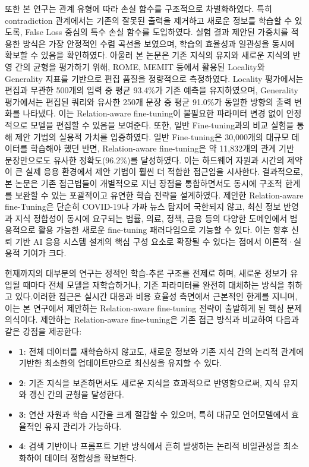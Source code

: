 \documentclass[a4paper,fleqn]{cas-sc}
\begin{document}
또한 본 연구는 관계 유형에 따라 손실 함수를 구조적으로 차별화하였다. 특히 contradiction 관계에서는 기존의 잘못된 출력을 제거하고 새로운 정보를 학습할 수 있도록, False Loss 중심의 특수 손실 함수를 도입하였다. 실험 결과 제안된 가중치를 적용한 방식은 가장 안정적인 수렴 곡선을 보였으며, 학습의 효율성과 일관성을 동시에 확보할 수 있음을 확인하였다.
아울러 본 논문은 기존 지식의 유지와 새로운 지식의 반영 간의 균형을 평가하기 위해, ROME, MEMIT 등에서 활용된 Locality와 Generality 지표를 기반으로 편집 품질을 정량적으로 측정하였다. Locality 평가에서는 편집과 무관한 500개의 입력 중 평균 93.4\%가 기존 예측을 유지하였으며, Generality 평가에서는 편집된 쿼리와 유사한 250개 문장 중 평균 91.0\%가 동일한 방향의 출력 변화를 나타냈다. 이는 Relation-aware fine-tuning이 불필요한 파라미터 변경 없이 안정적으로 모델을 편집할 수 있음을 보여준다.
또한, 일반 Fine-tuning과의 비교 실험을 통해 제안 기법의 실용적 가치를 입증하였다. 일반 Fine-tuning은 30,000개의 대규모 데이터를 학습해야 했던 반면, Relation-aware fine-tuning은 약 11,832개의 관계 기반 문장만으로도 유사한 정확도(96.2\%)를 달성하였다. 이는 하드웨어 자원과 시간의 제약이 큰 실제 응용 환경에서 제안 기법이 훨씬 더 적합한 접근임을 시사한다.
결과적으로, 본 논문은 기존 접근법들이 개별적으로 지닌 장점을 통합하면서도 동시에 구조적 한계를 보완할 수 있는 포괄적이고 유연한 학습 전략을 설계하였다. 제안한 Relation-aware fine-Tuning은 단순히 COVID-19나 가짜 뉴스 탐지에 국한되지 않고, 최신 정보 반영과 지식 정합성이 동시에 요구되는 법률, 의료, 정책, 금융 등의 다양한 도메인에서 범용적으로 활용 가능한 새로운 fine-tuning 패러다임으로 기능할 수 있다. 이는 향후 신뢰 기반 AI 응용 시스템 설계의 핵심 구성 요소로 확장될 수 있다는 점에서 이론적·실용적 기여가 크다.


현재까지의 대부분의 연구는 정적인 학습-추론 구조를 전제로 하며, 새로운 정보가 유입될 때마다 전체 모델을 재학습하거나, 기존 파라미터를 완전히 대체하는 방식을 취하고 있다.이러한 접근은 실시간 대응과 비용 효율성 측면에서 근본적인 한계를 지니며, 이는 본 연구에서 제안하는 Relation-aware fine-tuning 전략이 출발하게 된 핵심 문제의식이다.
제안하는 Relation-aware fine-tuning은 기존 접근 방식과 비교하여 다음과 같은 강점을 제공한다:
\begin{itemize}
	\item{\textbf{1}:
	전체 데이터를 재학습하지 않고도, 새로운 정보와 기존 지식 간의 논리적 관계에 기반한 최소한의 업데이트만으로 최신성을 유지할 수 있다.}

	\item{\textbf{2}:
	기존 지식을 보존하면서도 새로운 지식을 효과적으로 반영함으로써, 지식 유지와 갱신 간의 균형을 달성한다.}

	\item{\textbf{3}:
	연산 자원과 학습 시간을 크게 절감할 수 있으며, 특히 대규모 언어모델에서 효율적인 유지 관리가 가능하다.}

	\item{\textbf{4}:
	검색 기반이나 프롬프트 기반 방식에서 흔히 발생하는 논리적 비일관성을 최소화하여 데이터 정합성을 확보한다.}
\end{itemize}
\end{document}
